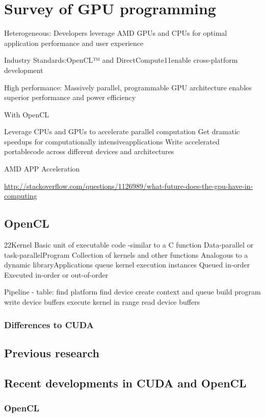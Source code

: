 \chapter{Survey of GPU programming}

Heterogeneous: Developers leverage AMD GPUs and CPUs for optimal application performance and user experience

Industry Standards:OpenCL™ and DirectCompute11enable cross-platform development

High performance: Massively parallel, programmable GPU architecture enables superior performance and power efficiency

With OpenCL

Leverage CPUs and GPUs to accelerate parallel computation
Get dramatic speedups for computationally intensiveapplications
Write accelerated portablecode across different devices and architectures


AMD APP Acceleration 


\hyperref[AMD]{http://stackoverflow.com/questions/1126989/what-future-does-the-gpu-have-in-computing}


\section{OpenCL}

22Kernel
Basic unit of executable code -similar to a C function
Data-parallel or task-parallelProgram
Collection of kernels and other functions
Analogous to a dynamic libraryApplications queue kernel execution instances
Queued in-order
Executed in-order or out-of-order

Pipeline - table:
find platform
find device
create context and queue
build program
write device buffers
execute kernel in range
read device buffers


\subsection{Differences to CUDA}

\section{Previous research}



\section{Recent developments in CUDA and OpenCL}
\subsection{OpenCL}

